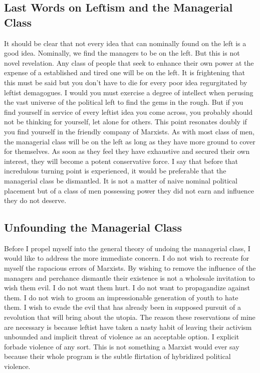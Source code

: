 \documentclass[12pt]{article}
\begin{document}
\subsection{Last Words on Leftism and the Managerial Class}
It should be clear that not every idea that can nominally found on the left is a good idea.
Nominally, we find the managers to be on the left.
But this is not novel revelation.
Any class of people that seek to enhance their own power at the expense of a established and tired one will be on the left.
It is frightening that this must be said but you don't have to die for every poor idea regurgitated by leftist demagogues.
I would you must exercise a degree of intellect when perusing the vast universe of the political left to find the gems in the rough.
But if you find yourself in service of every leftist idea you come across, you probably should not be thinking for yourself, let alone for others.
This point resonates doubly if you find yourself in the friendly company of Marxists.
As with most class of men, the managerial class will be on the left as long as they have more ground to cover for themselves.
As soon as they feel they have exhaustive and secured their own interest, they will become a potent conservative force.
I say that before that incredulous turning point is experienced, it would be preferable that the managerial class be dismantled.
It is not a matter of naive nominal political placement but of a class of men possessing power they did not earn and influence they do not deserve.

\subsection{Unfounding the Managerial Class}
Before I propel myself into the general theory of undoing the managerial class, I would like to address the more immediate concern.
I do not wish to recreate for myself the rapacious errors of Marxists.
By wishing to remove the influence of the managers and perchance dismantle their existence is not a wholesale invitation to wish them evil.
I do not want them hurt.
I do not want to propagandize against them.
I do not wish to groom an impressionable generation of youth to hate them.
I wish to evade the evil that has already been in supposed pursuit of a revolution that will bring about the utopia.
The reason these reservations of mine are necessary is because leftist have taken a nasty habit of leaving their activism unbounded and implicit threat of violence as an acceptable option.
I explicit forbade violence of any sort.
This is not something a Marxist would ever say because their whole program is the subtle flirtation of hybridized political violence.
\end{document}
